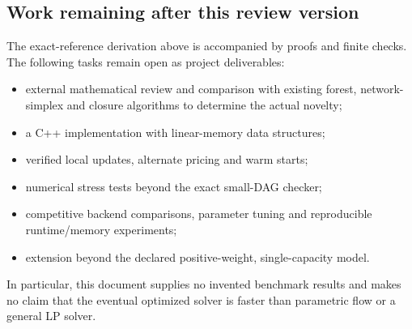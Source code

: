 \subsection{Work remaining after this review version}
The exact-reference derivation above is accompanied by proofs and finite
checks. The following tasks remain open as project deliverables:
\begin{itemize}
\item external mathematical review and comparison with existing forest,
network-simplex and closure algorithms to determine the actual novelty;
\item a C++ implementation with linear-memory data structures;
\item verified local updates, alternate pricing and warm starts;
\item numerical stress tests beyond the exact small-DAG checker;
\item competitive backend comparisons, parameter tuning and reproducible
runtime/memory experiments;
\item extension beyond the declared positive-weight, single-capacity model.
\end{itemize}
In particular, this document supplies no invented benchmark results and makes
no claim that the eventual optimized solver is faster than parametric flow
or a general LP solver.
